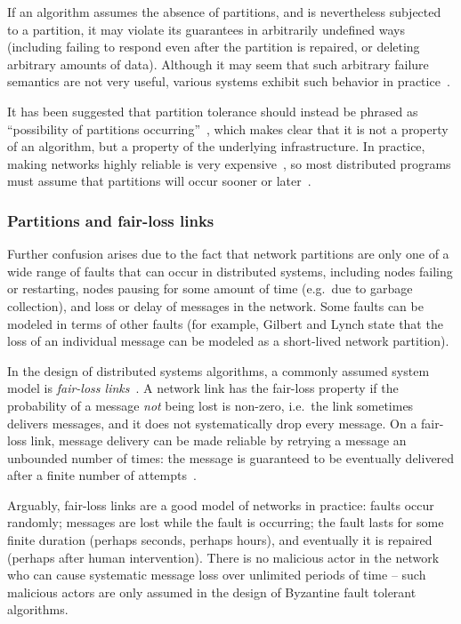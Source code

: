 \documentclass[a4paper,twocolumn,10pt]{article}
\begin{document}
If an algorithm assumes the absence of partitions, and is nevertheless subjected to a partition, it
may violate its guarantees in arbitrarily undefined ways (including failing to respond even after
the partition is repaired, or deleting arbitrary amounts of data). Although it may seem that such
arbitrary failure semantics are not very useful, various systems exhibit such behavior in
practice~\cite{Kingsbury2014tk, Kingsbury2015uk}.

It has been suggested that partition tolerance should instead be phrased as ``possibility of
partitions occurring''~\cite{Robinson2010tp}, which makes clear that it is not a property of an
algorithm, but a property of the underlying infrastructure. In practice, making networks highly
reliable is very expensive~\cite{Bailis2014jx}, so most distributed programs must assume that
partitions will occur sooner or later~\cite{Hale2010we}.

\subsubsection{Partitions and fair-loss links}\label{sec:fairloss}

Further confusion arises due to the fact that network partitions are only one of a wide range of
faults that can occur in distributed systems, including nodes failing or restarting, nodes pausing
for some amount of time (e.g.\ due to garbage collection), and loss or delay of messages in the
network. Some faults can be modeled in terms of other faults (for example, Gilbert and Lynch state
that the loss of an individual message can be modeled as a short-lived network partition).

In the design of distributed systems algorithms, a commonly assumed system model is \emph{fair-loss
links}~\cite{Cachin2011wt}. A network link has the fair-loss property if the probability of a
message \emph{not} being lost is non-zero, i.e.\ the link sometimes delivers messages, and it does
not systematically drop every message. On a fair-loss link, message delivery can be made reliable by
retrying a message an unbounded number of times: the message is guaranteed to be eventually
delivered after a finite number of attempts~\cite{Cachin2011wt}.

Arguably, fair-loss links are a good model of networks in practice: faults occur randomly; messages
are lost while the fault is occurring; the fault lasts for some finite duration (perhaps seconds,
perhaps hours), and eventually it is repaired (perhaps after human intervention). There is no
malicious actor in the network who can cause systematic message loss over unlimited periods of time
-- such malicious actors are only assumed in the design of Byzantine fault tolerant algorithms.
\end{document}
